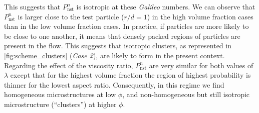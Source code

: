 This suggests that $P_\text{nst}^n$ is isotropic at these \textit{Galileo} numbers. We can observe that $P_\text{nst}^n$ is larger close to the test particle ($r/d = 1$) in the high volume fraction cases than in the low volume fraction cases.
In practice, if particles are more likely to be close to one another, it means that densely packed regions of particles are present in the flow.
This suggests that isotropic clusters, as represented in \ref{fig:scheme_clusters} (\textit{Case 2}), are likely to form in the present context. 
Regarding the effect of the viscosity ratio, $P_\text{nst}^n$ are very similar for both values of $\lambda$ except that for the highest volume fraction the region of highest probability is thinner for the lowest aspect ratio. 
Consequently, in this regime we find homogeneous microstructures at low $\phi$, and non-homogeneous but still isotropic microstructure (``clusters'') at higher $\phi$. 

